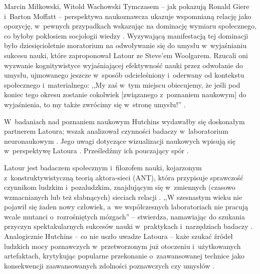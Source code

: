 \begin{artplenv2auth}{Marcin Miłkowski, Witold Wachowski}
Tymczasem -- jak pokazują Ronald Giere i~Barton Moffatt -- perspektywa naukoznawcza ukazuje wspomnianą relację jako opozycję, w~pewnych przypadkach wskazując na dominację wymiaru społecznego, co byłoby pokłosiem socjologii wiedzy
\parencites[zob. także][]{brown_science_2011}[][s.~301–302]{giere_distributed_2003}. %
 Wyzywającą manifestacją tej dominacji było dziesięcioletnie moratorium na odwoływanie się do umysłu w~wyjaśnianiu sukcesu nauki, które zaproponował Latour ze Steve'em Woolgarem. Rzucali oni wyzwanie kognitywistyce wyjaśniającej efektywność nauki przez odwołanie do umysłu, ujmowanego jeszcze w~sposób odcieleśniony i~oderwany od kontekstu społecznego i~materialnego: ,,My zaś w~tym miejscu obiecujemy, że jeśli pod koniec tego okresu zostanie cokolwiek [związanego z~poznaniem naukowym] do wyjaśnienia, to my także zwrócimy się w~stronę umysłu!'' 
\parencite[][s.~366]{latour_zycie_2020}.%


W~badaniach nad poznaniem naukowym Hutchins wydawałby się doskonałym partnerem Latoura; wszak analizował czynności badaczy w~laboratorium neuronaukowym
\parencite[][]{alac_i_2004}. %
 Jego uwagi dotyczące wizualizacji naukowych wpisują się w~perspektywę Latoura 
\parencite[np.][]{latour_wizualizacja_2012}. %
 Prześledźmy ich pouczający spór 
\parencites[][]{latour_cogito_1996}[][]{engestrom_distributed_1996}.%


Latour jest badaczem społecznym i~filozofem nauki, kojarzonym z~konstruktywistyczną teorią aktora-sieci (ANT), która przypisuje sprawczość czynnikom ludzkim i~pozaludzkim, znajdującym się w~zmiennych (czasowo wzmacnianych lub też słabnących) sieciach relacji
\parencite[zob. np.][]{latour_splatajac_2010}. %
 ,,W szesnastym wieku nie pojawił się żaden nowy człowiek, a~we współczesnych laboratoriach nie pracują wcale mutanci o~rozrośniętych mózgach'' -- stwierdza, namawiając do szukania przyczyn spektakularnych sukcesów nauki w~praktykach i~narzędziach badaczy 
\parencite[][s.~208]{latour_wizualizacja_2012}. %
 Analogicznie Hutchins -- co nie uszło uwadze Latoura -- każe szukać źródeł ludzkich mocy poznawczych w~przetworzonym już otoczeniu i~użytkowanych artefaktach, krytykując popularne przekonanie o~zaawansowanej technice jako konsekwencji zaawansowanych zdolności poznawczych czy umysłów 
\parencite[][s.~169, 355]{hutchins_cognition_1995}.%



\end{artplenv2auth}
